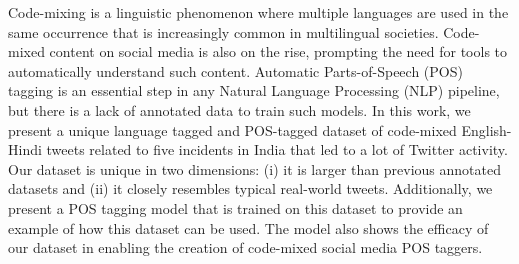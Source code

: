 Code-mixing is a linguistic phenomenon where multiple languages are used in the same occurrence that is increasingly common in multilingual societies. Code-mixed content on social media is also on the rise, prompting the need for tools to automatically understand such content. Automatic Parts-of-Speech (POS) tagging is an essential step in any Natural Language Processing (NLP) pipeline, but there is a lack of annotated data to train such models. In this work, we present a unique language tagged and POS-tagged dataset of code-mixed English-Hindi tweets related to five incidents in India that led to a lot of Twitter activity. Our dataset is unique in two dimensions: (i) it is larger than previous annotated datasets and (ii) it closely resembles typical real-world tweets. Additionally, we present a POS tagging model that is trained on this dataset to provide an example of how this dataset can be used. The model also shows the efficacy of our dataset in enabling the creation of code-mixed social media POS taggers.
